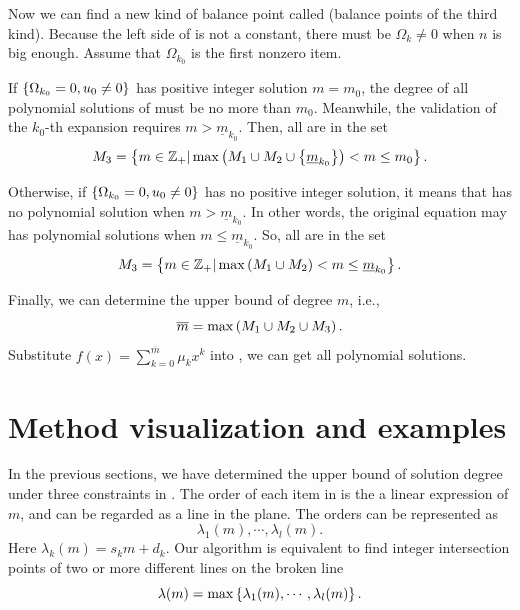 Now we can find a new kind of balance point called \BPthree{} (balance points of the third kind). Because the left side of  is not a constant, there must be $\Omega_k\neq 0$ when $n$ is big enough. Assume that $\Omega_{k_0}$ is the first nonzero item. 

If $\left\{\Omega_{k_0}=0,u_0\neq 0\right\}$ has positive integer solution $m=m_0$, the degree of all polynomial solutions of  must be no more than $m_0$. Meanwhile, the validation of the $k_0$-th expansion requires $m>\underline{m}_{k_0}$. Then,  all \BPthree{} are in the set
\begin{equation}
M_3=\left\{m\in \mathbb Z_+|\max\left(M_1\cup M_2 \cup \left\{\underline{m}_{k_0}\right\}\right)<m\le m_0\right\}.
\end{equation}

Otherwise, if $\left\{\Omega_{k_0}=0,u_0\neq 0\right\}$ has no positive integer solution, it means that  has no polynomial solution when $m>\underline{m}_{k_0}$. In other words, the original equation may has polynomial solutions when $m\le \underline{m}_{k_0}$. So, all \BPthree{} are in the set
\begin{equation}
M_3=\left\{m\in \mathbb Z_+|\max\left(M_1\cup M_2\right)<m\le \underline{m}_{k_0}\right\}.
\end{equation}

Finally, we can determine the upper bound of degree $m$, i.e.,
\begin{equation}
\overline m =\max\left(M_1\cup M_2\cup M_3\right).
\end{equation}
Substitute $f(x)=\sum_{k=0}^{\overline m}{\mu_k x^k}$ into , we can get all polynomial solutions.

\section{Method visualization and examples} \label{visualization-02}

In the previous sections, we have determined the upper bound of solution degree under three constraints in . The order of each item in  is the a linear expression of $m$, and can be regarded as a line in the plane. The orders can be represented as
\begin{equation}
\lambda_1(m),\cdots,\lambda_l(m).
\end{equation}
Here $\lambda_k(m)=s_k m+d_k$. Our algorithm is equivalent to find integer intersection points of two or more different lines on the broken line
\begin{equation}
\lambda(m)=\max\left\{\lambda_1(m),\cdots,\lambda_l(m)\right\}.
\end{equation}


